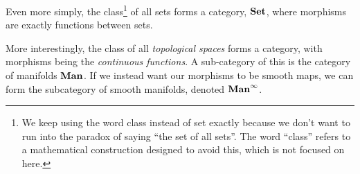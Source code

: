 \begin{appendices}
	Even more simply, the class\footnote{We keep using the word class instead of set exactly because we don't want to run into the paradox of saying ``the set of all sets''. The word ``class'' refers to a mathematical construction designed to avoid this, which is not focused on here.} of all sets forms a category, $\text{\textbf{Set}}$, where morphisms are exactly functions between sets.
	
	More interestingly, the class of all \emph{topological spaces} forms a category, with morphisms being the \emph{continuous functions}. A sub-category of this is the category of manifolds $\text{\textbf{Man}}$. If we instead want our morphisms to be smooth maps, we can form the subcategory of smooth manifolds, denoted $\text{\textbf{Man}}^\infty$.
	

\end{appendices}

